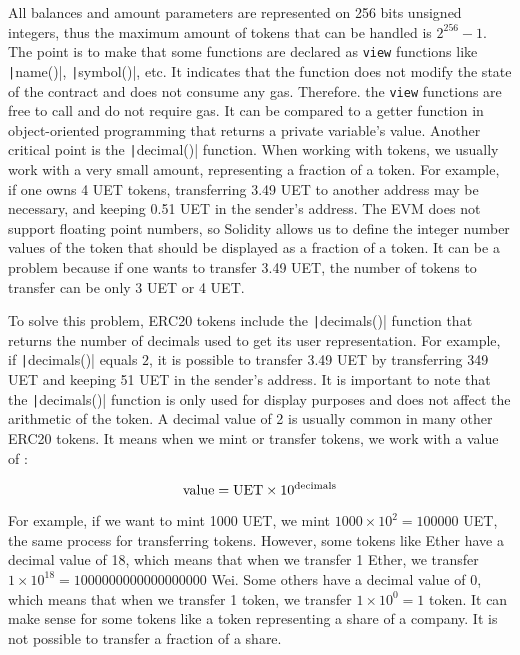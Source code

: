 All balances and amount parameters are represented on 256 bits unsigned integers, thus the maximum amount of tokens that can be handled is $2^{256} - 1$. The point is to make that some functions are declared as \texttt{view} functions
like \texttt|name()|, \texttt|symbol()|, etc. It indicates that the function does not modify the state of the contract and does not consume any gas. Therefore. the \texttt{view} functions are free to call and do not require gas.
It can be compared to a getter function in object-oriented programming that returns a private variable's value. Another critical point is the \texttt|decimal()| function. When working
with tokens, we usually work with a very small amount, representing a fraction of a token. For example, if one owns 4 UET tokens, transferring 3.49 UET to another address may be necessary, and keeping 0.51 UET in the sender's address. The EVM does not support floating point numbers, so Solidity allows us to define the integer number values of the token that should be displayed as a fraction of a token.
It can be a problem because if one wants to transfer 3.49 UET, the number of tokens to transfer can be only 3 UET or 4 UET.

To solve this problem, ERC20 tokens include the \texttt|decimals()| function that returns the number of decimals used to get its user representation. For example, if \texttt|decimals()| equals $2$,
it is possible to transfer 3.49 UET by transferring 349 UET and keeping 51 UET in the sender's address. It is important to note that the \texttt|decimals()| function is only used for display purposes
and does not affect the arithmetic of the token. A decimal value of 2 is usually common in many other ERC20 tokens. It means when we mint or transfer tokens, we work with a value of :

\begin{center}
    \begin{equation}
        \centering
        \text{value} = \text{UET} \times 10^{\text{decimals}}
    \end{equation}
    \label{eq:decimals}
 \end{center}
 
 
 For example, if we want to mint 1000 UET, we mint $1000 \times 10^2 = 100000$ UET, the same process for transferring tokens. However, some tokens
 like Ether have a decimal value of 18, which means that when we transfer 1 Ether, we transfer $1 \times 10^{18} = 1000000000000000000$ Wei. Some others have a decimal value of 0,
 which means that when we transfer 1 token, we transfer $1 \times 10^0 = 1$ token. It can make sense for some tokens like a token representing a share of a company. It is not possible to transfer
 a fraction of a share. 

